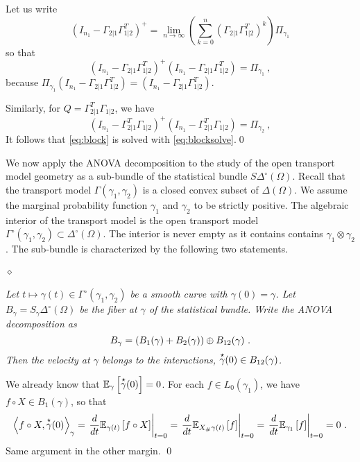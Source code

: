\documentclass[runningheads]{llncs}
\begin{document}
  Let us write
%
\begin{equation*}
  (I_{n_1}-\Gamma_{2|1}\Gamma_{1|2}^T)^{+} = \lim_{n\to\infty} \left(\sum_{k=0}^n (\Gamma_{2|1}\Gamma_{1|2}^T)^k\right) \Pi_{\gamma_1}  
\end{equation*}
%
so that
%
\begin{equation*}
  (I_{n_1}-\Gamma_{2|1}\Gamma_{1|2}^T)^{+}(I_{n_1}-\Gamma_{2|1}\Gamma_{1|2}^T) = \Pi_{\gamma_1} \ ,
\end{equation*}
%
because $\Pi_{\gamma_1} (I_{n_1}-\Gamma_{2|1}\Gamma_{1|2}^T) = (I_{n_1}-\Gamma_{2|1}\Gamma_{1|2}^T)$.

Similarly, for $Q = \Gamma_{2|1}^T\Gamma_{1|2}$, we have
%
\begin{equation*}
  (I_{n_1}-\Gamma_{2|1}^T\Gamma_{1|2})^{+}(I_{n_1}-\Gamma_{2|1}^T\Gamma_{1|2}) = \Pi_{\gamma_2} \ ,
\end{equation*}
%
It follows that \cref{eq:block} is solved with \cref{eq:blocksolve}.\qed

We now apply the ANOVA decomposition to the study of the open
transport model geometry as a sub-bundle of the statistical bundle
$S\Delta^\circ(\Omega)$. Recall that the transport model
$\Gamma(\gamma_1,\gamma_2)$ is a closed convex subset of
$\Delta(\Omega)$. We assume the marginal probability function
$\gamma_1$ and $\gamma_2$ to be strictly positive. The algebraic
interior of the transport model is the open transport model
$\Gamma^\circ(\gamma_1,\gamma_2) \subset \Delta^\circ(\Omega)$. The
interior is never empty as it contains contains
$\gamma_1 \otimes \gamma_2$. The sub-bundle is characterized by the
following two statements.

\paragraph{$\bm\diamond$} \emph{Let $t \mapsto \gamma(t) \in \Gamma^\circ(\gamma_1,\gamma_2)$ be a smooth curve with $\gamma(0)=\gamma$. Let $B_\gamma = S_\gamma \Delta^\circ(\Omega)$ be the fiber at $\gamma$ of the statistical bundle. Write the ANOVA decomposition as
  \begin{equation*}
    B_{\gamma} = (B_1(\gamma) + B_2(\gamma)) \oplus B_{12}(\gamma) \ .
  \end{equation*}
  Then the velocity at $\gamma$ belongs to the interactions, $\overset{\star}{\gamma}(0) \in B_{12}(\gamma)$.}


We already know that ${\operatorname{\mathbb E}}_{\gamma}\left[\overset{\star}{\gamma}(0)\right] = 0$. For each $f \in L_0(\gamma_1)$, we have $f \circ X \in B_1(\gamma)$, so that 
%
    \begin{equation*}
    \left\langle f \circ X , \overset{\star}{\gamma}(0) \right\rangle_{\gamma} = \left. \frac{d}{dt} {\operatorname{\mathbb E}}_{\gamma(t)}\left[f \circ X\right] \right|_{t=0} = \left. \frac{d}{dt} {\operatorname{\mathbb E}}_{X_{\#}\gamma(t)}\left[f\right] \right|_{t=0} = \left. \frac{d}{dt} {\operatorname{\mathbb E}}_{\gamma_1}\left[f\right] \right|_{t=0} = 0 \ .
    \end{equation*}
%
Same argument in the other margin. \qed
\end{document}
